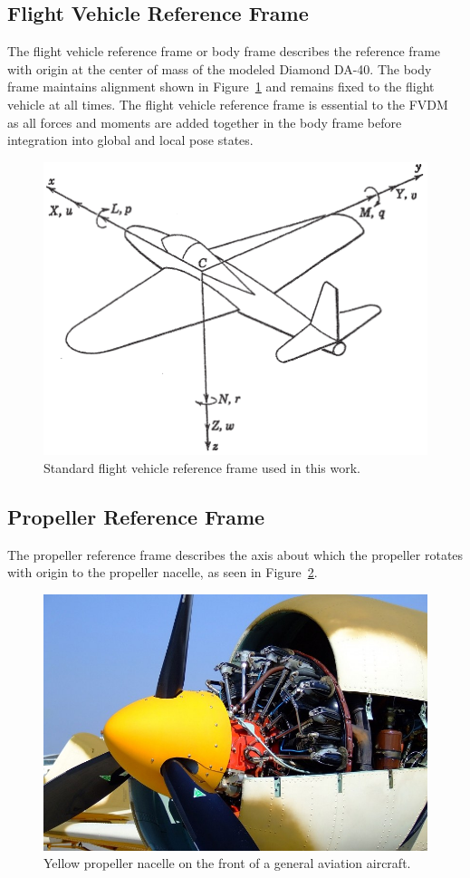 \subsection{Flight Vehicle Reference Frame}
The flight vehicle reference frame or body frame describes the reference frame with origin at the center of mass of the modeled Diamond DA-40. The body frame maintains alignment shown in Figure~\ref{fig:flightvehiclereferenceframe} and remains fixed to the flight vehicle at all times. The flight vehicle reference frame is essential to the FVDM as all forces and moments are added together in the body frame before integration into global and local pose states.

\begin{figure}[!ht]\label{fig:flightvehiclereferenceframe}
    \centering
    \includegraphics[width=0.85\linewidth]{Figures/bodyframe.png}
    \caption{Standard flight vehicle reference frame used in this work.~\cite{peetSpacecraftAircraftDynamics}}
\end{figure}

\subsection{Propeller Reference Frame}
The propeller reference frame describes the axis about which the propeller rotates with origin to the propeller nacelle, as seen in Figure~\ref{fig:propnacelle}.

\begin{figure}[!ht]\label{fig:propnacelle}
    \centering
    \includegraphics[width=0.65\linewidth]{Figures/propnacelle.jpg}
    \caption{Yellow propeller nacelle on the front of a general aviation aircraft.}
\end{figure}

